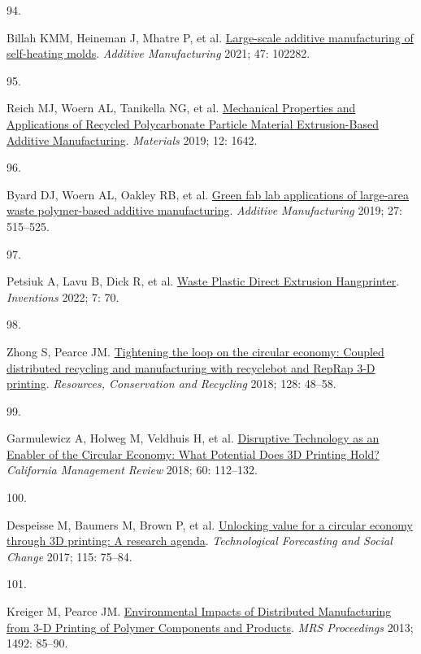 \documentclass[
  12pt,
  a4paperpaper,
  onecolumn]{article}
\newlength{\cslhangindent}
\newlength{\csllabelwidth}
\newlength{\cslentryspacingunit} %
\newenvironment{CSLReferences}[2] %
 {%
  \setlength{\parindent}{0pt}
  \ifodd #1
  \let\oldpar\par
  \def\par{\hangindent=\cslhangindent\oldpar}
  \fi
  \setlength{\parskip}{#2\cslentryspacingunit}
 }%
 {}
\newcommand{\CSLLeftMargin}[1]{\parbox[t]{\csllabelwidth}{#1}}
\newcommand{\CSLRightInline}[1]{\parbox[t]{\linewidth - \csllabelwidth}{#1}\break}
\begin{document}
\begin{CSLReferences}{0}{0}
\leavevmode{}%
\CSLLeftMargin{94. }%
\CSLRightInline{Billah KMM, Heineman J, Mhatre P, et al.
\href{https://doi.org/10.1016/J.ADDMA.2021.102282}{Large-scale additive
manufacturing of self-heating molds}. \emph{Additive Manufacturing}
2021; 47: 102282.}

\leavevmode{}%
\CSLLeftMargin{95. }%
\CSLRightInline{Reich MJ, Woern AL, Tanikella NG, et al.
\href{https://doi.org/10.3390/ma12101642}{Mechanical {Properties} and
{Applications} of {Recycled Polycarbonate Particle Material
Extrusion-Based Additive Manufacturing}}. \emph{Materials} 2019; 12:
1642.}

\leavevmode{}%
\CSLLeftMargin{96. }%
\CSLRightInline{Byard DJ, Woern AL, Oakley RB, et al.
\href{https://doi.org/10.1016/j.addma.2019.03.006}{Green fab lab
applications of large-area waste polymer-based additive manufacturing}.
\emph{Additive Manufacturing} 2019; 27: 515--525.}

\leavevmode{}%
\CSLLeftMargin{97. }%
\CSLRightInline{Petsiuk A, Lavu B, Dick R, et al.
\href{https://doi.org/10.3390/inventions7030070}{Waste {Plastic Direct
Extrusion Hangprinter}}. \emph{Inventions} 2022; 7: 70.}

\leavevmode{}%
\CSLLeftMargin{98. }%
\CSLRightInline{Zhong S, Pearce JM.
\href{https://doi.org/10.1016/j.resconrec.2017.09.023}{Tightening the
loop on the circular economy: {Coupled} distributed recycling and
manufacturing with recyclebot and {RepRap} 3-{D} printing}.
\emph{Resources, Conservation and Recycling} 2018; 128: 48--58.}

\leavevmode{}%
\CSLLeftMargin{99. }%
\CSLRightInline{Garmulewicz A, Holweg M, Veldhuis H, et al.
\href{https://doi.org/10.1177/0008125617752695}{Disruptive {Technology}
as an {Enabler} of the {Circular Economy}: {What Potential Does 3D
Printing Hold}?} \emph{California Management Review} 2018; 60:
112--132.}

\leavevmode{}%
\CSLLeftMargin{100. }%
\CSLRightInline{Despeisse M, Baumers M, Brown P, et al.
\href{https://doi.org/10.1016/j.techfore.2016.09.021}{Unlocking value
for a circular economy through {3D} printing: {A} research agenda}.
\emph{Technological Forecasting and Social Change} 2017; 115: 75--84.}

\leavevmode{}%
\CSLLeftMargin{101. }%
\CSLRightInline{Kreiger M, Pearce JM.
\href{https://doi.org/10.1557/opl.2013.319}{Environmental {Impacts} of
{Distributed Manufacturing} from 3-{D Printing} of {Polymer Components}
and {Products}}. \emph{MRS Proceedings} 2013; 1492: 85--90.}


\end{CSLReferences}
\end{document}
